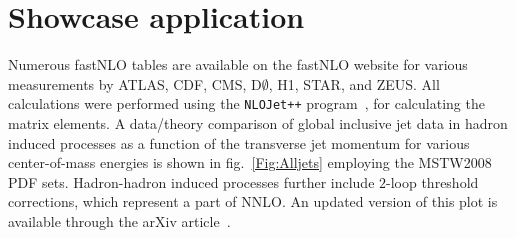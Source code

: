 \documentclass{DISproc}
\begin{document}
%




\section{Showcase application}

Numerous fastNLO tables are available on the fastNLO website
\cite{Fnlo:2012:Online} for various measurements by ATLAS, CDF, CMS,
D$\emptyset$, H1, STAR, and ZEUS\@.  All calculations were performed
using the \texttt{NLOJet++} program~\cite{Nagy:2001xb,Nagy:2001fj,Nagy:2003tz},
for calculating the matrix elements.  A data/theory comparison of global
inclusive jet data in hadron induced processes as a function of the
transverse jet momentum for various center-of-mass energies is shown
in fig.~\ref{Fig:Alljets} employing the MSTW2008 PDF
sets. Hadron-hadron induced processes further include $2$-loop
threshold corrections, which represent a part of NNLO\@. An
updated version of this plot is available through the arXiv
article~\cite{Wobisch:2011ij}.
\end{document}
